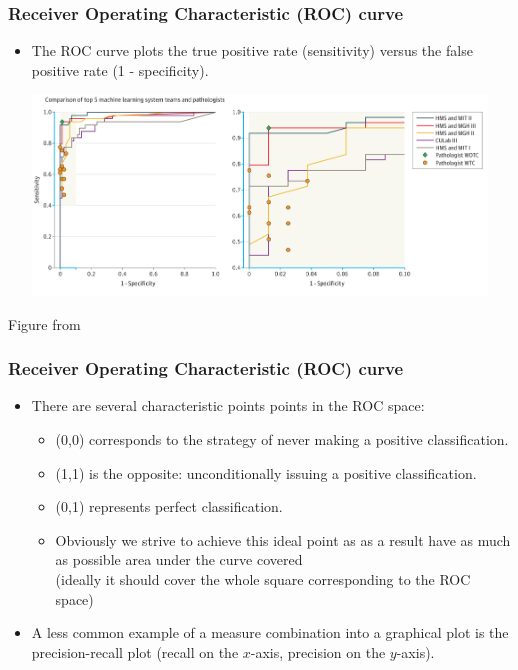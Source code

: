 \documentclass[notes]{beamer}          %
\begin{document}
\begin{frame}
\frametitle{Receiver Operating Characteristic (ROC) curve}
    \begin{itemize}
        \item The ROC curve plots the true positive rate (sensitivity) versus the false positive rate (1 - specificity).
        \begin{center}
        \includegraphics[width=0.95\textwidth]{figures/week_2/camelyon_roc.png}
        \end{center}
    \end{itemize}
    {\tiny Figure from \cite{camelyon}}
\end{frame}

\begin{frame}
\frametitle{Receiver Operating Characteristic (ROC) curve}
    \begin{itemize}
        \item  There are several characteristic points points in the ROC space:
            \begin{itemize}
                \item (0,0) corresponds to the strategy of never making a positive classification.
                \item (1,1) is the opposite: unconditionally issuing a positive classification.
                \item (0,1) represents perfect classification.
                \item Obviously we strive to achieve this ideal point as as a result have as much as possible area under the curve covered \\
                (ideally it should cover the whole square corresponding to the ROC space)
            \end{itemize}
        \item  A less common example of a measure combination into a graphical plot is the precision-recall plot (recall on the $x$-axis, precision on the $y$-axis).
    \end{itemize}
\end{frame}
\end{document}
